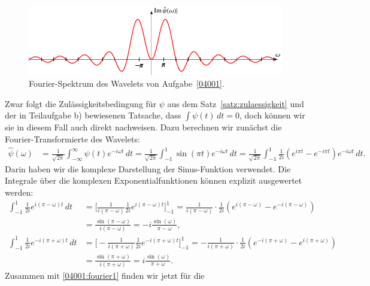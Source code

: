 \begin{loesung}
\begin{teilaufgaben}
\begin{figure}
\includegraphics{chapters/uebungsaufgaben/04001-spektrum.pdf}
\caption{Fourier-Spektrum des Wavelets von Aufgabe~\ref{04001}.
\label{04001:spektrum}}
\end{figure}
\item
Zwar folgt die Zulässigkeitsbedingung für $\psi$ aus dem
Satz~\ref{satz:zulaessigkeit} und der in Teilaufgabe b) bewiesenen
Tatsache, dass $\int \psi(t)\,dt=0$, doch können wir sie in diesem Fall
auch direkt nachweisen.
Dazu berechnen wir zunächst die Fourier-Transformierte des Wavelets:
\begin{align}
\hat{\psi}(\omega)
&=
\frac{1}{\sqrt{2\pi}}
\int_{-\infty}^\infty \psi(t)e^{-i\omega t}\,dt
=
\frac{1}{\sqrt{2\pi}}
\int_{-1}^{1} \sin(\pi t)e^{-i\omega t}\,dt
=
\frac{1}{\sqrt{2\pi}}
\int_{-1}^1
\frac1{2i} (e^{i\pi t}-e^{-i\pi t})e^{-i\omega t}\,dt.
\label{04001:fourier1}
\end{align}
Darin haben wir die komplexe Darstellung der Sinus-Funktion verwendet.
Die Integrale über die komplexen Exponentialfunktionen können explizit
ausgewertet werden:
\begin{align*}
\int_{-1}^1 \frac{1}{2i}e^{i(\pi-\omega)t}\,dt
&=
\biggl[
\frac{1}{i(\pi-\omega)}
\frac1{2i}
e^{i(\pi-\omega)t}
\biggr]_{-1}^1
=
\frac{1}{i(\pi-\omega)}
\cdot
\frac1{2i}(e^{i(\pi-\omega)}-e^{-i(\pi-\omega)})
\\
&=
\frac{\sin(\pi-\omega)}{i(\pi-\omega)}
=
-i\frac{\sin(\omega)}{\pi-\omega},
\\
\int_{-1}^1 \frac{1}{2i}e^{-i(\pi+\omega)t}\,dt
&=
\biggl[
-\frac{1}{i(\pi+\omega)}
\frac1{2i}
e^{-i(\pi+\omega)t}
\biggr]_{-1}^1
=
-\frac{1}{i(\pi+\omega)}
\cdot
\frac1{2i}(e^{-i(\pi+\omega)}-e^{i(\pi+\omega)})
\\
&=
\frac{\sin(\pi+\omega)}{i(\pi+\omega)}
=
i\frac{\sin(\omega)}{\pi+\omega}.
\end{align*}
Zusammen mit \eqref{04001:fourier1} finden wir jetzt für die

\end{teilaufgaben}
\end{loesung}
